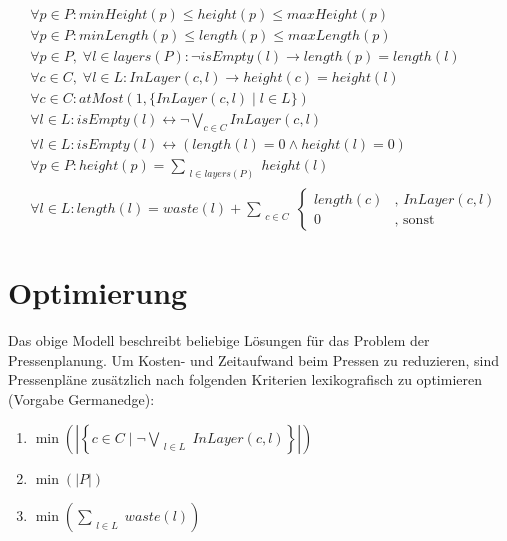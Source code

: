 \begin{align}
    & \forall p \in P: minHeight(p) \leq height(p) \leq maxHeight(p) \\[10pt]
    & \forall p \in P: minLength(p) \leq length(p) \leq maxLength(p) \\[10pt]
    & \forall p \in P,\; \forall l \in layers(P): \neg isEmpty(l) \rightarrow length(p) = length(l) \\[10pt]
    & \forall c \in C,\; \forall l \in L: InLayer(c,l) \rightarrow height(c) = height(l) \\[10pt]
    & \forall c \in C: atMost(1,\{ InLayer(c,l) \mid l \in L \}) \\[10pt]
    & \forall l \in L: isEmpty(l) \leftrightarrow \neg\bigvee_{c \in C} InLayer(c,l) \\[10pt]
    & \forall l \in L: isEmpty(l) \leftrightarrow (length(l) = 0 \land height(l) = 0) \\[10pt]
    & \forall p \in P: height(p) = \sum_{\substack{l \in layers(P)}} height(l)  \\[10pt]
    & \forall l \in L: length(l) = waste(l) + \sum_{\substack{c \in C}}
    \begin{cases}
        length(c) & \text{, } InLayer(c,l) \\
        0 & \text{, sonst}
    \end{cases}
\end{align}

\section{Optimierung}
\label{sec:optimierung}
Das obige Modell beschreibt beliebige Lösungen für das Problem der Pressenplanung.
Um Kosten- und Zeitaufwand beim Pressen zu reduzieren, sind Pressenpläne zusätzlich nach folgenden Kriterien lexikografisch zu optimieren (Vorgabe Germanedge):
\begin{enumerate}
    \item $ \min \left( \left\lvert \left\{ c \in C \mid \neg\bigvee\limits_{\substack{l \in L}} InLayer(c,l) \right\} \right\rvert \right) $
    \item $ \min (\lvert P \rvert) $
    \item $ \min \left(\sum\limits_{\substack{l \in L}} waste(l) \right) $
\end{enumerate}
